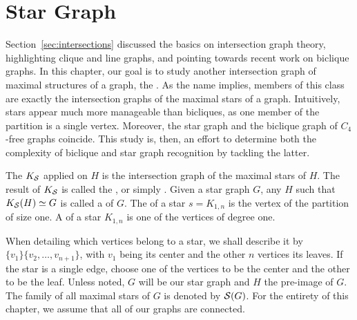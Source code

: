 \chapter{Star Graph}
\label{ch:star_graph}
Section~\ref{sec:intersections} discussed the basics on intersection graph theory, highlighting clique and line graphs, and pointing towards recent work on biclique graphs.
In this chapter, our goal is to study another intersection graph of maximal structures of a graph, the .
As the name implies, members of this class are exactly the intersection graphs of the maximal stars of a graph.
Intuitively, stars appear much more manageable than bicliques, as one member of the partition is a single vertex.
Moreover, the star graph and the biclique graph of $C_4$-free graphs coincide.
This study is, then, an effort to determine both the complexity of biclique and star graph recognition by tackling the latter.

The  $K_{\mathcal{S}}$ applied on $H$ is the intersection graph of the maximal stars of $H$.
The result of $K_{\mathcal{S}}$ is called the , or simply .
Given a star graph $G$, any $H$ such that $K_{\mathcal{S}}(H) \simeq G$ is called a  of $G$.
The  of a star $s = K_{1,n}$ is the vertex of the partition of size one.
A  of a star $K_{1,n}$ is one of the vertices of degree one.

When detailing which vertices belong to a star, we shall describe it by $\{v_1\}\{v_2, \dots, v_{n+1}\}$, with $v_1$ being its center and the other $n$ vertices its leaves.
If the star is a single edge, choose one of the vertices to be the center and the other to be the leaf.
Unless noted, $G$ will be our star graph and $H$ the pre-image of $G$.
The family of all maximal stars of $G$ is denoted by $\mathcal{S}(G)$.
For the entirety of this chapter, we assume that all of our graphs are connected.



